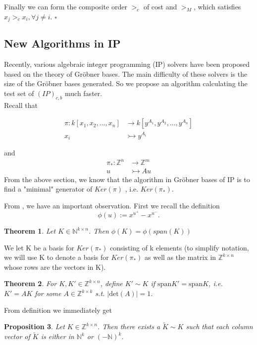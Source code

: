 \documentclass{article}
\theoremstyle{plain}
\newtheorem{theorem}{Theorem}[section]
\newtheorem{proposition}[theorem]{Proposition}
\theoremstyle{definition}
\begin{document}
Finally we can form the composite order $>_c$ of cost and $>_M$, which satisfies $x_j >_{c} x_i,\forall j\neq i$. \hfill $\square$

\subsection{New Algorithms in IP}
Recently, various algebraic integer programming (IP) solvers have been proposed based on the theory of Gröbner bases. The main difficulty of these solvers is the size of the Gröbner bases generated. So we propose an algorithm calculating the test set of $(IP)_{c,b}$ much faster.\\

Recall that 

\begin{align*}
\pi:  k[x_1,x_2,...,x_n] & \to k[y^{A_1},y^{A_2},...,y^{A_n}] \\
 x_{i} & \rightarrowtail y^{A_i}
\end{align*}

and
\begin{align*}
 \pi_*:  \mathbb{Z}^{n} & \to\mathbb{Z}^{m} \\
 u & \rightarrowtail  Au
\end{align*}
From the above section, we know that the algorithm in Gröbner bases of IP is to find a "minimal" generator of $Ker(\pi)$ , i.e. $Ker(\pi_*)$.

From \cite{kernel}, we have an important observation. First we recall the definition
$$\phi(u):=x^{u^+}-x^{u^-}.$$

\begin{theorem}Let $K \in \mathbb{N}^{k\times n}$. Then $\phi(K)=\phi(span(K))$\end{theorem}

We let K be a basis for $Ker(\pi_*)$ consisting of k elements (to simplify notation, we will use K to denote a basis for $Ker(\pi_*)$ as well as the matrix in $\mathbb{Z}^{k\times n}$ whose rows are the vectors in K). 

\begin{theorem}For $K,K'\in \mathbb{Z}^{k\times n}$, define $K'\sim K$ if $\text{span} K' = \text{span} K$, i.e. $K' = AK$ for some $A\in \mathbb{Z}^{k\times k}$ s.t. $|\text{det}(A)|=1$. \end{theorem}

From definition we immediately get 

\begin{proposition}Let $K\in \mathbb{Z}^{k\times n}$. Then there exists a $\tilde{K}\sim K$ such that each column vector of $\tilde{K}$ is either in $\mathbb{N}^k$ or $(-\mathbb{N})^k$. \end{proposition}
\end{document}
